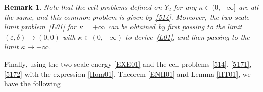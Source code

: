 \documentclass[11pt,a4paper]{article}
\numberwithin{equation}{section}
\def\O{\Omega}
\def\a{{\alpha}}
\def\D{{\mathbb{D}}}
\def\Mc{{\mathcal{M}}}
\def\wh{\widehat }
\def\X{\times }
\def\Gu{{\bf u}}
\def\GU{{\bf U}}
\newtheorem{remark}{Remark}
\begin{document}
\begin{remark}\label{ReM02}
	Note that the cell problems defined on $Y_2$ for any $\kappa\in(0,+\infty]$ are all the same, and this common problem is given by~\eqref{514}. Moreover, the two-scale limit problem~\eqref{L01} for $\kappa=+\infty$ can be obtained by first passing to the limit $(\varepsilon,\delta)\to(0,0)$ with $\kappa\in(0,+\infty)$ to derive~\eqref{L01}, and then passing to the limit $\kappa\to+\infty$.
\end{remark}
%
Finally, using the two-scale energy \eqref{EXE01} and the cell problems \eqref{514}, \eqref{5171}, \eqref{5172} with the expression \eqref{Hom01}, Theorem \ref{ENH01} and Lemma \ref{HT01}, we have the following
\end{document}
